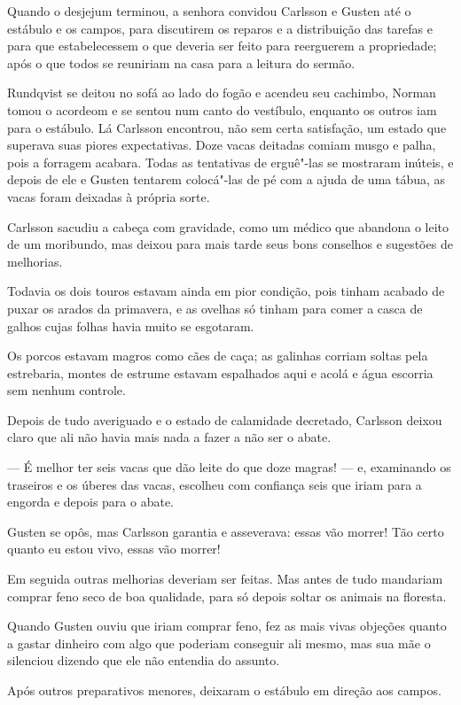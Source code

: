 Quando o desjejum terminou, a senhora convidou Carlsson e Gusten até o
estábulo e os campos, para discutirem os reparos e a distribuição das tarefas
e para que estabelecessem o que deveria ser feito para reerguerem a propriedade;
após o que todos se reuniriam na casa para a leitura do sermão.

Rundqvist se deitou no sofá ao lado do fogão e acendeu seu cachimbo, Norman
tomou o acordeom e se sentou num canto do vestíbulo, enquanto os outros iam para
o estábulo. Lá Carlsson encontrou, não sem certa satisfação, um estado que
superava suas piores expectativas. Doze vacas deitadas comiam musgo e palha, 
pois a forragem acabara. Todas as tentativas de erguê"-las se mostraram inúteis, e
depois de ele e Gusten tentarem colocá"-las de pé com a ajuda de uma tábua, as
vacas foram deixadas à própria sorte.

Carlsson sacudiu a cabeça com gravidade, como um médico que abandona o leito de um
moribundo, mas deixou para mais tarde seus bons conselhos e sugestões de
melhorias.

Todavia os dois touros estavam ainda em pior condição, pois tinham acabado de puxar
os arados da primavera, e as ovelhas só tinham para comer a casca de galhos
cujas folhas havia muito se esgotaram.

Os porcos estavam magros como cães de caça; as galinhas corriam soltas pela
estrebaria, montes de estrume estavam espalhados aqui e acolá e água escorria
sem nenhum controle.

Depois de tudo averiguado e o estado de calamidade decretado, Carlsson deixou
claro que ali não havia mais nada a fazer a não ser o abate.

--- É melhor ter seis vacas que dão leite do que doze magras! --- e, examinando os
traseiros e os úberes das vacas, escolheu com confiança seis que iriam para a
engorda e depois para o abate.

Gusten se opôs, mas Carlsson garantia e asseverava: essas vão morrer! Tão certo
quanto eu estou vivo, essas vão morrer!

Em seguida outras melhorias deveriam ser feitas. Mas antes de tudo mandariam
comprar feno seco de boa qualidade, para só depois soltar os animais na
floresta.

Quando Gusten ouviu que iriam comprar feno, fez as mais vivas objeções quanto a
gastar dinheiro com algo que poderiam conseguir ali mesmo, mas sua mãe o
silenciou dizendo que ele não entendia do assunto.

Após outros preparativos menores, deixaram o estábulo em direção aos campos.

